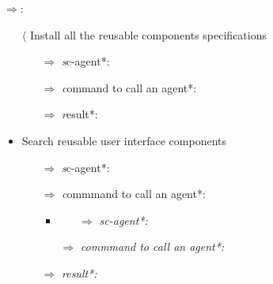 \documentclass[twocolumn]{article}
\begin{document}
$\Rightarrow $: \hfill\break 
\begin{itemize}
\item[$\langle$] {\qquad Install all the reusable components \break
specifications} 
    \begin{itemize}
\item[$\Rightarrow $] \textit sc-agent*: \hfill\break 
[ScComponentManagerInitAgent]
\item[$\Rightarrow $] \textit command to call an agent*: \hfill{}
\item[$\Rightarrow $] \textit result*: \hfill{}
 \end{itemize}   
 \end{itemize}       
\begin{itemize}
\item{Search reusable user interface
components} 
    \begin{itemize}
\item[$\Rightarrow $] \textit sc-agent*: \hfill\break 
[ScComponentManagerSearchAgent]
\item[$\Rightarrow $] \textit commmand to call an agent*: \hfill{}%
\hfill\break
\hfill\break


\begin{itemize}
\item{} 
    \begin{itemize}
\item[$\Rightarrow $]\textit {sc-agent*:} \hfill\break 
[ScComponentManagerInstallAgent]
\end{itemize}   
\end{itemize}   

    \begin{itemize}
\item [$\Rightarrow $] \textit {commmand to call an agent*:} \hfill{}
\end{itemize}   
\end{itemize}   

    \begin{itemize}
\item[$\Rightarrow $]\textit {result*:
} \hfill{}
\end{itemize}   
\end{itemize} 
\end{document}
